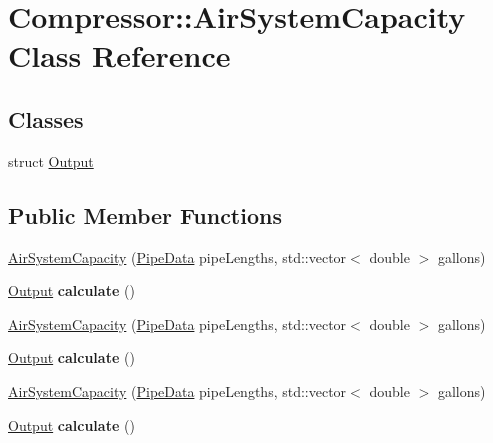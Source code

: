 \hypertarget{class_compressor_1_1_air_system_capacity}{}\section{Compressor\+:\+:Air\+System\+Capacity Class Reference}
\label{class_compressor_1_1_air_system_capacity}
\subsection*{Classes}
\begin{DoxyCompactItemize}
\item 
struct \hyperlink{struct_compressor_1_1_air_system_capacity_1_1_output}{Output}
\end{DoxyCompactItemize}
\subsection*{Public Member Functions}
\begin{DoxyCompactItemize}
\item 
\hyperlink{class_compressor_1_1_air_system_capacity_a270fa85146172b46703970a1bc8fe724}{Air\+System\+Capacity} (\hyperlink{struct_compressor_1_1_pipe_data}{Pipe\+Data} pipe\+Lengths, std\+::vector$<$ double $>$ gallons)
\item 
\mbox{\label{class_compressor_1_1_air_system_capacity_aed64b8bb2bfe66e7e8c9df69f5ad3f7e}} 
\hyperlink{struct_compressor_1_1_air_system_capacity_1_1_output}{Output} {\bfseries calculate} ()
\item 
\hyperlink{class_compressor_1_1_air_system_capacity_a270fa85146172b46703970a1bc8fe724}{Air\+System\+Capacity} (\hyperlink{struct_compressor_1_1_pipe_data}{Pipe\+Data} pipe\+Lengths, std\+::vector$<$ double $>$ gallons)
\item 
\mbox{\label{class_compressor_1_1_air_system_capacity_a7ad83d7e71bc7b53e84dc565feb5bbb7}} 
\hyperlink{struct_compressor_1_1_air_system_capacity_1_1_output}{Output} {\bfseries calculate} ()
\item 
\hyperlink{class_compressor_1_1_air_system_capacity_a270fa85146172b46703970a1bc8fe724}{Air\+System\+Capacity} (\hyperlink{struct_compressor_1_1_pipe_data}{Pipe\+Data} pipe\+Lengths, std\+::vector$<$ double $>$ gallons)
\item 
\mbox{\label{class_compressor_1_1_air_system_capacity_a7ad83d7e71bc7b53e84dc565feb5bbb7}} 
\hyperlink{struct_compressor_1_1_air_system_capacity_1_1_output}{Output} {\bfseries calculate} ()
\end{DoxyCompactItemize}


